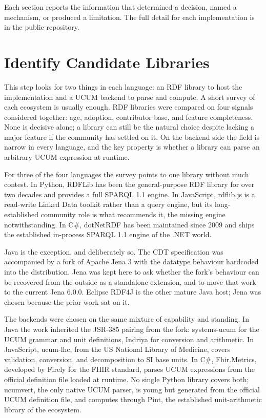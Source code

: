 Each section reports the information that determined a decision, named a mechanism, or produced a limitation. The full detail for each implementation is in the public repository.

\section{Identify Candidate Libraries}

This step looks for two things in each language: an RDF library to host the implementation and a UCUM backend to parse and compute. A short survey of each ecosystem is usually enough. RDF libraries were compared on four signals considered together: age, adoption, contributor base, and feature completeness. None is decisive alone; a library can still be the natural choice despite lacking a major feature if the community has settled on it. On the backend side the field is narrow in every language, and the key property is whether a library can parse an arbitrary UCUM expression at runtime.

For three of the four languages the survey points to one library without much contest. In Python, RDFLib has been the general-purpose RDF library for over two decades and provides a full SPARQL 1.1 engine. In JavaScript, rdflib.js is a read-write Linked Data toolkit rather than a query engine, but its long-established community role is what recommends it, the missing engine notwithstanding. In  C\#, dotNetRDF has been maintained since 2009 and ships the established in-process SPARQL 1.1 engine of the .NET world.

Java is the exception, and deliberately so. The CDT specification was accompanied by a fork of Apache Jena 3 with the datatype behaviour hardcoded into the distribution. Jena was kept here to ask whether the fork's behaviour can be recovered from the outside as a standalone extension, and to move that work to the current Jena 6.0.0. Eclipse RDF4J is the other mature Java host; Jena was chosen because the prior work sat on it.

The backends were chosen on the same mixture of capability and standing. In Java the work inherited the JSR-385 pairing from the fork: systems-ucum for the UCUM grammar and unit definitions, Indriya for conversion and arithmetic. In JavaScript, ucum-lhc, from the US National Library of Medicine, covers validation, conversion, and decomposition to SI base units. In  C\#, Fhir.Metrics, developed by Firely for the FHIR standard, parses UCUM expressions from the official definition file loaded at runtime. No single Python library covers both; ucumvert, the only native UCUM parser, is young but generated from the official UCUM definition file, and computes through Pint, the established unit-arithmetic library of the ecosystem.

